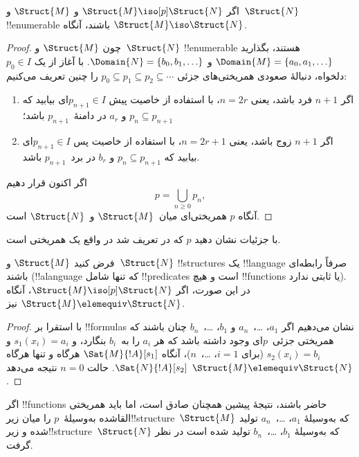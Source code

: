 \documentclass[../../../include/open-logic-section]{subfiles}
\begin{document}
\begin{thm}
  اگر $\Struct{M} \iso[p] \Struct{N}$ و $\Struct{M}$ و~$\Struct{N}$
  !!{enumerable} باشند، آنگاه $\Struct{M} \iso \Struct{N}$.
\end{thm}

\begin{proof}
  چون $\Struct{M}$ و~$\Struct{N}$ !!{enumerable} هستند، بگذارید
  $\Domain{M} = \{a_0, a_1, \ldots \}$ و
  $\Domain{N} = \{b_0, b_1, \ldots \}$. با آغاز از یک
  $p_0 \in I$ دلخواه، دنبالهٔ صعودی همریختی‌های جزئی
  $p_0 \subseteq p_1 \subseteq p_2 \subseteq \cdots$ را چنین تعریف
  می‌کنیم:
  \begin{enumerate}
  \item اگر $n+1$ فرد باشد، یعنی $n = 2r$، با استفاده از خاصیت پیش
    $p_{n+1} \in I$ای بیابید که $p_n \subseteq p_{n+1}$ و $a_r$ در
    دامنهٔ~$p_{n+1}$ باشد؛
  \item اگر $n+1$ زوج باشد، یعنی $n = 2r+1$، با استفاده از خاصیت پس
    $p_{n+1} \in I$ای بیابید که $p_n \subseteq p_{n+1}$ و $b_r$ در
    برد~$p_{n+1}$ باشد.
  \end{enumerate}
اگر اکنون قرار دهیم
\[
p = \bigcup_{n\ge 0} p_n,
\]
آنگاه $p$ همریختی‌ای میان~$\Struct{M}$ و~$\Struct{N}$ است.
\end{proof}

\begin{prob}
  با جزئیات نشان دهید $p$ که در 
  تعریف شد در واقع یک همریختی است.
\end{prob}

\begin{thm}
  فرض کنید $\Struct{M}$ و~$\Struct{N}$ !!{structure}s یک
  !!{language} صرفاً رابطه‌ای باشند (!!a{language} که تنها شامل
  !!{predicate}s است و هیچ !!{function}s یا ثابتی ندارد). در این صورت،
  اگر $\Struct{M} \iso[p] \Struct{N}$، آنگاه
  $\Struct{M} \elemequiv \Struct{N}$ نیز.
\end{thm}

\begin{proof}
  با استقرا بر !!{formula}s نشان می‌دهیم اگر $a_1$، \dots،~$a_n$ و
  $b_1$، \dots،~$b_n$ چنان باشند که همریختی جزئی~$p$ای وجود داشته
  باشد که هر $a_i$ را به~$b_i$ بنگارد، و $s_1(x_i) =a_i$ و
  $s_2(x_i) =b_i$ (برای $i =1$، \dots،~$n$)، آنگاه
  $\Sat{M}{!A}[s_1]$ هرگاه و تنها هرگاه $\Sat{N}{!A}[s_2]$. حالت
  $n=0$ نتیجه می‌دهد $\Struct{M} \elemequiv \Struct{N}$.
\end{proof}

\begin{rem}
اگر !!{function}s حاضر باشند، نتیجهٔ پیشین همچنان صادق است، اما باید
همریختی القاشده به‌وسیلهٔ~$p$ را میان زیر!!{structure}~$\Struct{M}$ که
به‌وسیلهٔ $a_1$، \dots،~$a_n$ تولید شده و زیر!!{structure}~$\Struct{N}$
که به‌وسیلهٔ $b_1$، \dots،~$b_n$ تولید شده است در نظر گرفت.
\end{rem}
\end{document}
